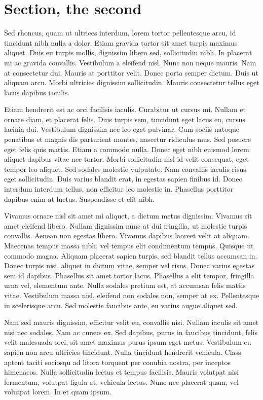 \section{Section, the second}

Sed rhoncus, quam ut ultrices interdum, lorem tortor pellentesque arcu, id tincidunt nibh nulla a dolor. Etiam gravida
tortor sit amet turpis maximus aliquet. Duis eu turpis mollis, dignissim libero sed, sollicitudin nibh. In placerat mi
ac gravida convallis. Vestibulum a eleifend nisl. Nunc non neque mauris. Nam at consectetur dui. Mauris at porttitor
velit. Donec porta semper dictum. Duis ut aliquam arcu. Morbi ultricies dignissim sollicitudin. Mauris consectetur
tellus eget lacus dapibus iaculis.

Etiam hendrerit est ac orci facilisis iaculis. Curabitur ut cursus mi. Nullam et ornare diam, et placerat felis. Duis
turpis sem, tincidunt eget lacus eu, cursus lacinia dui. Vestibulum dignissim nec leo eget pulvinar. Cum sociis natoque
penatibus et magnis dis parturient montes, nascetur ridiculus mus. Sed posuere eget felis quis mattis. Etiam a commodo
nulla. Donec eget nibh euismod lorem aliquet dapibus vitae nec tortor. Morbi sollicitudin nisl id velit consequat, eget
tempor leo aliquet. Sed sodales molestie vulputate. Nam convallis iaculis risus eget sollicitudin. Duis varius blandit
erat, in egestas sapien finibus id. Donec interdum interdum tellus, non efficitur leo molestie in. Phasellus porttitor
dapibus enim at luctus. Suspendisse et elit nibh.

Vivamus ornare nisl sit amet mi aliquet, a dictum metus dignissim. Vivamus sit amet eleifend libero. Nullam dignissim
nunc at dui fringilla, ut molestie turpis convallis. Aenean non egestas libero. Vivamus dapibus laoreet velit at
aliquam. Maecenas tempus massa nibh, vel tempus elit condimentum tempus. Quisque ut commodo magna. Aliquam placerat
sapien turpis, sed blandit tellus accumsan in. Donec turpis nisi, aliquet in dictum vitae, semper vel risus. Donec
varius egestas sem id dapibus. Phasellus sit amet tortor lacus. Phasellus a elit tempor, fringilla urna vel, elementum
ante. Nulla sodales pretium est, at accumsan felis mattis vitae. Vestibulum massa nisl, eleifend non sodales non, semper
at ex. Pellentesque in scelerisque arcu. Sed molestie faucibus ante, eu varius augue aliquet sed.

Nam sed mauris dignissim, efficitur velit eu, convallis nisi. Nullam iaculis sit amet nisi nec sodales. Nam ac cursus
ex. Sed dapibus, purus in faucibus tincidunt, felis velit malesuada orci, sit amet maximus purus ipsum eget metus.
Vestibulum eu sapien non arcu ultricies tincidunt. Nulla tincidunt hendrerit vehicula. Class aptent taciti sociosqu ad
litora torquent per conubia nostra, per inceptos himenaeos. Nulla sollicitudin lectus et tempus facilisis. Mauris
volutpat nisi fermentum, volutpat ligula at, vehicula lectus. Nunc nec placerat quam, vel volutpat lorem. In et quam
ipsum.

